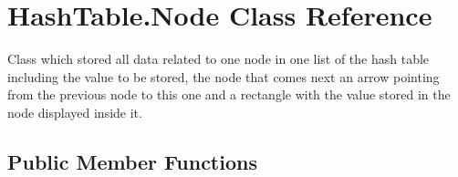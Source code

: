 \hypertarget{class_hash_table_1_1_node}{}\section{Hash\+Table.\+Node Class Reference}
\label{class_hash_table_1_1_node}


Class which stored all data related to one node in one list of the hash table including the value to be stored, the node that comes next an arrow pointing from the previous node to this one and a rectangle with the value stored in the node displayed inside it.  


\subsection*{Public Member Functions}
